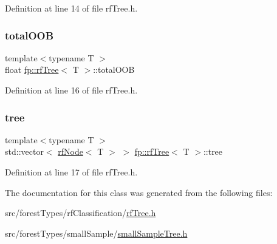 Definition at line 14 of file rf\+Tree.\+h.

\mbox{\label{classfp_1_1rfTree_aa200dc228adc20c12e514364d2b674df}} 
\subsubsection{\texorpdfstring{total\+O\+OB}{totalOOB}}
{\footnotesize\ttfamily template$<$typename T $>$ \\
float \hyperlink{classfp_1_1rfTree}{fp\+::rf\+Tree}$<$ T $>$\+::total\+O\+OB\hspace{0.3cm}{\ttfamily [protected]}}



Definition at line 16 of file rf\+Tree.\+h.

\mbox{\label{classfp_1_1rfTree_a1d5c209715f4044a85878c17e2b3ee53}} 
\subsubsection{\texorpdfstring{tree}{tree}}
{\footnotesize\ttfamily template$<$typename T $>$ \\
std\+::vector$<$ \hyperlink{classrfNode}{rf\+Node}$<$ T $>$ $>$ \hyperlink{classfp_1_1rfTree}{fp\+::rf\+Tree}$<$ T $>$\+::tree\hspace{0.3cm}{\ttfamily [protected]}}



Definition at line 17 of file rf\+Tree.\+h.



The documentation for this class was generated from the following files\+:\begin{DoxyCompactItemize}
\item 
src/forest\+Types/rf\+Classification/\hyperlink{rfTree_8h}{rf\+Tree.\+h}\item 
src/forest\+Types/small\+Sample/\hyperlink{smallSampleTree_8h}{small\+Sample\+Tree.\+h}\end{DoxyCompactItemize}
